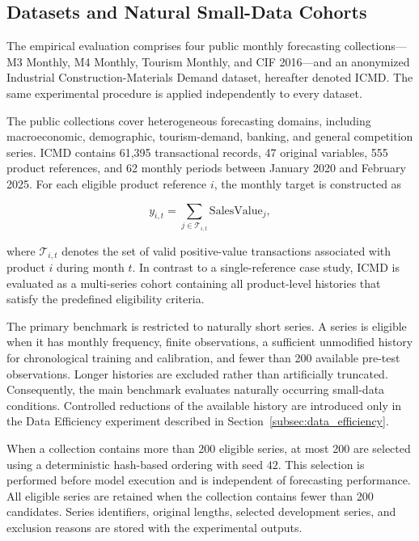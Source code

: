 \documentclass[review,number,sort&compress]{elsarticle}
\begin{document}
\subsection{Datasets and Natural Small-Data Cohorts}
\label{subsec:datasets}

The empirical evaluation comprises four public monthly forecasting collections---M3 Monthly, M4 Monthly, Tourism Monthly, and CIF 2016---and an anonymized Industrial Construction-Materials Demand dataset, hereafter denoted ICMD. The same experimental procedure is applied independently to every dataset.

The public collections cover heterogeneous forecasting domains, including macroeconomic, demographic, tourism-demand, banking, and general competition series. ICMD contains 61,395 transactional records, 47 original variables, 555 product references, and 62 monthly periods between January 2020 and February 2025. For each eligible product reference \(i\), the monthly target is constructed as

\begin{equation}
y_{i,t}
=
\sum_{j\in\mathcal{T}_{i,t}}
\mathrm{SalesValue}_{j},
\label{eq:icmd_aggregation}
\end{equation}

where \(\mathcal{T}_{i,t}\) denotes the set of valid positive-value transactions associated with product \(i\) during month \(t\). In contrast to a single-reference case study, ICMD is evaluated as a multi-series cohort containing all product-level histories that satisfy the predefined eligibility criteria.

The primary benchmark is restricted to naturally short series. A series is eligible when it has monthly frequency, finite observations, a sufficient unmodified history for chronological training and calibration, and fewer than 200 available pre-test observations. Longer histories are excluded rather than artificially truncated. Consequently, the main benchmark evaluates naturally occurring small-data conditions. Controlled reductions of the available history are introduced only in the Data Efficiency experiment described in Section~\ref{subsec:data_efficiency}.

When a collection contains more than 200 eligible series, at most 200 are selected using a deterministic hash-based ordering with seed \(42\). This selection is performed before model execution and is independent of forecasting performance. All eligible series are retained when the collection contains fewer than 200 candidates. Series identifiers, original lengths, selected development series, and exclusion reasons are stored with the experimental outputs.
\end{document}
